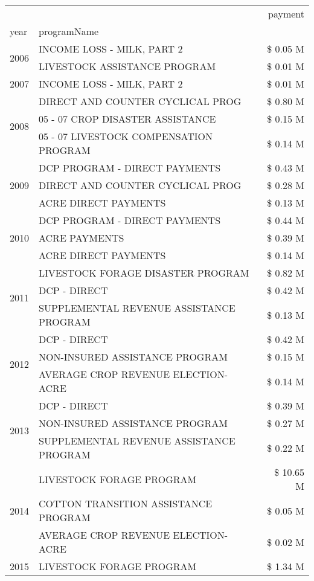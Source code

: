 \begin{tabular}{llr}
\toprule
 &  & payment \\
year & programName &  \\
\midrule
\multirow[t]{2}{*}{2006} & INCOME LOSS - MILK, PART 2 & \$ 0.05 M \\
 & LIVESTOCK ASSISTANCE PROGRAM & \$ 0.01 M \\
\cline{1-3}
2007 & INCOME LOSS - MILK, PART 2 & \$ 0.01 M \\
\cline{1-3}
\multirow[t]{3}{*}{2008} & DIRECT AND COUNTER CYCLICAL PROG & \$ 0.80 M \\
 & 05 - 07 CROP DISASTER ASSISTANCE & \$ 0.15 M \\
 & 05 - 07 LIVESTOCK COMPENSATION PROGRAM & \$ 0.14 M \\
\cline{1-3}
\multirow[t]{3}{*}{2009} & DCP PROGRAM - DIRECT PAYMENTS & \$ 0.43 M \\
 & DIRECT AND COUNTER CYCLICAL PROG & \$ 0.28 M \\
 & ACRE DIRECT PAYMENTS & \$ 0.13 M \\
\cline{1-3}
\multirow[t]{3}{*}{2010} & DCP PROGRAM - DIRECT PAYMENTS & \$ 0.44 M \\
 & ACRE PAYMENTS & \$ 0.39 M \\
 & ACRE DIRECT PAYMENTS & \$ 0.14 M \\
\cline{1-3}
\multirow[t]{3}{*}{2011} & LIVESTOCK FORAGE DISASTER PROGRAM & \$ 0.82 M \\
 & DCP - DIRECT & \$ 0.42 M \\
 & SUPPLEMENTAL REVENUE ASSISTANCE PROGRAM & \$ 0.13 M \\
\cline{1-3}
\multirow[t]{3}{*}{2012} & DCP - DIRECT & \$ 0.42 M \\
 & NON-INSURED ASSISTANCE PROGRAM & \$ 0.15 M \\
 & AVERAGE CROP REVENUE ELECTION-ACRE & \$ 0.14 M \\
\cline{1-3}
\multirow[t]{3}{*}{2013} & DCP - DIRECT & \$ 0.39 M \\
 & NON-INSURED ASSISTANCE PROGRAM & \$ 0.27 M \\
 & SUPPLEMENTAL REVENUE ASSISTANCE PROGRAM & \$ 0.22 M \\
\cline{1-3}
\multirow[t]{3}{*}{2014} & LIVESTOCK FORAGE PROGRAM & \$ 10.65 M \\
 & COTTON TRANSITION ASSISTANCE PROGRAM & \$ 0.05 M \\
 & AVERAGE CROP REVENUE ELECTION-ACRE & \$ 0.02 M \\
\cline{1-3}
\multirow[t]{3}{*}{2015} & LIVESTOCK FORAGE PROGRAM & \$ 1.34 M \\

\end{tabular}
